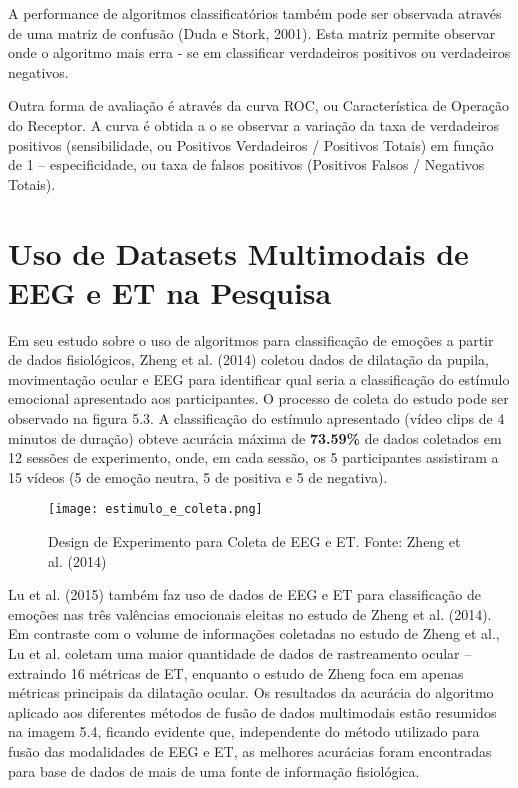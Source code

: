 A performance de algoritmos classificatórios também pode ser observada 
através de uma matriz de confusão (Duda e Stork, 2001).
Esta matriz permite observar onde o algoritmo mais erra - se em 
classificar verdadeiros positivos ou verdadeiros negativos. 

Outra forma de avaliação é através da curva ROC, 
ou Característica de Operação do Receptor. A curva é obtida a
o se observar a variação da taxa de verdadeiros positivos 
(sensibilidade, ou Positivos Verdadeiros / Positivos Totais) em função de 1 – 
especificidade, ou taxa de falsos positivos (Positivos Falsos / Negativos Totais). 

\section{Uso de Datasets Multimodais de EEG e ET na Pesquisa}

Em seu estudo sobre o uso de algoritmos para classificação de emoções a partir de dados fisiológicos, 
Zheng et al. (2014) coletou dados de dilatação da pupila, movimentação ocular e EEG para 
identificar qual seria a classificação do estímulo emocional apresentado aos participantes. 
O processo de coleta do estudo pode ser observado na figura 5.3. 
A classificação do estímulo apresentado (vídeo clips de 4 minutos de duração) 
obteve acurácia máxima de \textbf{73.59\%} de dados coletados em 12 sessões de experimento, 
onde, em cada sessão, os 5 participantes assistiram a 15 vídeos 
(5 de emoção neutra, 5 de positiva e 5 de negativa). 
 

\begin{figure}[!h]
      \centering
      \texttt{[image: estimulo\_e\_coleta.png]}
      \caption{Design de Experimento para Coleta de EEG e ET. Fonte: Zheng et al. (2014)}
\end{figure}

Lu et al. (2015) também faz uso de dados de EEG e ET para classificação de emoções nas três 
valências emocionais eleitas no estudo de Zheng et al. (2014). Em contraste com o volume de 
informações coletadas no estudo de Zheng et al., Lu et al. coletam uma maior quantidade de dados de rastreamento ocular – 
extraindo 16 métricas de ET, enquanto o estudo de Zheng foca em apenas métricas principais da dilatação ocular. 
Os resultados da acurácia do algoritmo aplicado aos diferentes métodos de fusão de dados multimodais estão resumidos na imagem 5.4, 
ficando evidente que, independente do método utilizado para fusão das modalidades de EEG e ET, 
as melhores acurácias foram encontradas para base de dados de mais de uma fonte de informação fisiológica. 

